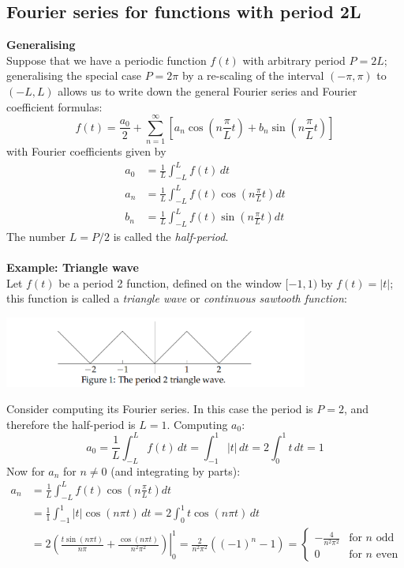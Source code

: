 \documentclass{report}
\begin{document}
\subsection{Fourier series for functions with period 2L}
\textbf{Generalising}\\
Suppose that we have a periodic function $f(t)$ with arbitrary period $P=2L$; generalising the special case
$P=2\pi$ by a re-scaling of the interval $(-\pi,\pi)$ to
$(-L,L)$ allows us to write down the general Fourier series and Fourier coefficient formulas:
\begin{equation*}
f(t)=\frac{a_0}{2}+\sum^\infty_{n=1}\left[a_n\cos\left(n\frac{\pi}{L}t\right)
+b_n\sin\left(n\frac{\pi}{L}t\right)\right]
\end{equation*}
with Fourier coefficients given by
\begin{align*}
a_0&=\frac{1}{L}\int^L_{-L}f(t)\,dt\\
a_n&=\frac{1}{L}\int^L_{-L}f(t)\cos\left(n\frac{\pi}{L}t\right)dt\\
b_n&=\frac{1}{L}\int^L_{-L}f(t)\sin\left(n\frac{\pi}{L}t\right)dt
\end{align*}
The number $L=P/2$ is called the \textit{half-period}.\\
\vspace{1mm}\\
\textbf{Example: Triangle wave}\\
Let $f(t)$ be a period 2 function, defined on the window $[-1,1)$ by $f(t)=|t|$; this function is called a 
\textit{triangle wave} or \textit{continuous sawtooth function}:
\begin{center}
\includegraphics[width=10cm]{38}\\
\end{center}
Consider computing its Fourier series. In this case the period is $P=2$, and therefore the half-period is $L=1$. 
Computing $a_0$:
\begin{equation*}
a_0=\frac{1}{L}\int^L_{-L}f(t)\,dt=\int^1_{-1}|t|\,dt
=2\int^1_{0}t\,dt=1
\end{equation*}
Now for $a_n$ for $n\neq0$ (and integrating by parts):
\begin{align*}
a_n&=\frac{1}{L}\int^L_{-L}f(t)\cos\left(n\frac{\pi}{L}t\right)dt\\
&=\frac{1}{1}\int^1_{-1}|t|\cos(n\pi t)\,dt=2\int^1_0t\cos(n\pi t)\,dt\\
&=2\left(\frac{t\sin(n\pi t)}{n\pi}+\left.\frac{\cos(n\pi t)}{n^2\pi^2}\right)\right|^1_0
=\frac{2}{n^2\pi^2}((-1)^n-1)=\begin{cases}
-\frac{4}{n^2\pi^2}&\text{for $n$ odd}\\
0&\text{for $n$ even}\end{cases}
\end{align*}
\end{document}
